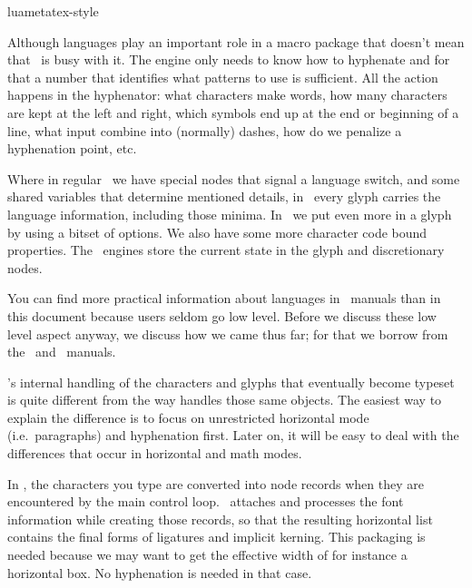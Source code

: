 
\environment luametatex-style

\startdocument[title=Languages]

\startsection[title={Introduction}]

Although languages play an important role in a macro package that doesn't mean
that \TEX\ is busy with it. The engine only needs to know how to hyphenate and
for that a number that identifies what patterns to use is sufficient. All the
action happens in the hyphenator: what characters make words, how many characters
are kept at the left and right, which symbols end up at the end or beginning of a
line, what input combine into (normally) dashes, how do we penalize a hyphenation
point, etc.

Where in regular \TEX\ we have special nodes that signal a language switch, and
some shared variables that determine mentioned details, in \LUATEX\ every glyph
carries the language information, including those minima. In \LUAMETATEX\ we put
even more in a glyph by using a bitset of options. We also have some more
character code bound properties. The \LUATEX\ engines store the current state in
the glyph and discretionary nodes.

You can find more practical information about languages in \CONTEXT\ manuals than
in this document because users seldom go low level. Before we discuss these low
level aspect anyway, we discuss how we came thus far; for that we borrow from the
\LUATEX\ and \LUAMETATEX\ manuals.

\stopsection

\startsection[title={Evolution}]

\LUATEX's internal handling of the characters and glyphs that eventually become
typeset is quite different from the way  handles those same objects. The
easiest way to explain the difference is to focus on unrestricted horizontal mode
(i.e.\ paragraphs) and hyphenation first. Later on, it will be easy to deal
with the differences that occur in horizontal and math modes.

In , the characters you type are converted into  node records
when they are encountered by the main control loop. \TEX\ attaches and processes
the font information while creating those records, so that the resulting \quote
{horizontal list} contains the final forms of ligatures and implicit kerning.
This packaging is needed because we may want to get the effective width of for
instance a horizontal box. No hyphenation is needed in that case.

